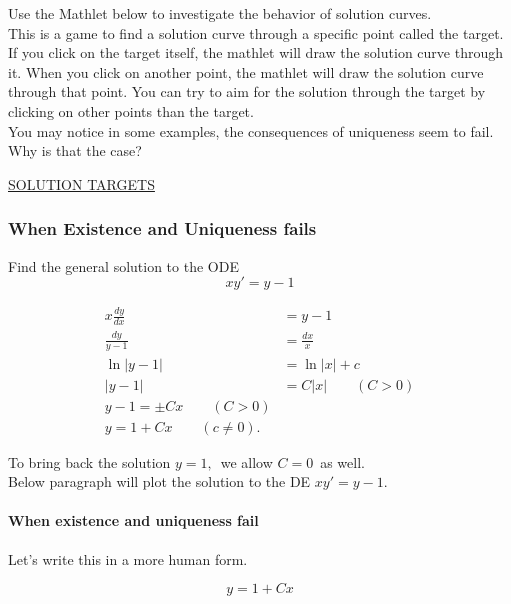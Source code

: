 Use the Mathlet below to investigate the behavior of solution curves.\\

This is a game to find a solution curve through a specific point called the target.
If you click on the target itself, the mathlet will draw the solution curve through it.
When you click on another point, the mathlet will draw the solution curve through that point.
You can try to aim for the solution through the target by clicking on other points than the target.\\

You may notice in some examples, the consequences of uniqueness seem to fail. Why is that the case?

\href{http://mathlets.org/mathlets/solution-targets/}
{SOLUTION TARGETS}

\clearpage

\subsubsection{When Existence and Uniqueness fails}

\begin{problem}
  Find the general solution to the ODE
  \begin{equation*}
    xy' = y -1
  \end{equation*}
\end{problem}

\begin{align*}
  x \frac{dy}{dx} &= y-1 \\
  \frac{dy}{y - 1} &= \frac{dx}{x} \\
  \ln |y - 1| &= \ln |x| + c \\
  |y - 1| &= C|x| \qquad (C > 0) \\
  y - 1= \pm Cx \qquad (C > 0) \\
  y = 1 + Cx \qquad (c \neq 0). 
\end{align*}

To bring back the solution $y=1,\,$ we allow $C = 0\,$ as well.\\
Below paragraph will plot the solution to the DE $xy' = y -1$. 

\paragraph{When existence and uniqueness fail}
Let's write this in a more human form.

\begin{equation*}
  y = 1 + Cx
\end{equation*}

